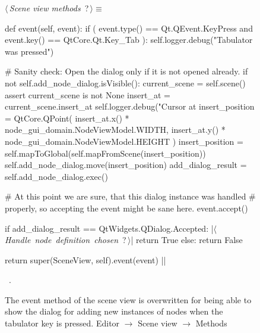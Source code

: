 \documentclass[%
    a4paper,    %
    justified,  %
    nobib,      %
    openany     %
]{tufte-book}
\makeatletter
\renewcommand{\label}[1]{\@tufte@label{##1}}%
\makeatother
\begin{document}
\begin{figure}
\begin{flushleft} \small
\begin{minipage}{\linewidth}\label{scrap151}\raggedright\small
{} $\langle\,${\itshape Scene view methods}\nobreak\ {\footnotesize {?}}$\,\rangle\equiv$
\vspace{-1ex}
\begin{pythoncode}
def event(self, event):
    if (
            event.type() == Qt.QEvent.KeyPress and
            event.key()  == QtCore.Qt.Key_Tab
    ):
        self.logger.debug("Tabulator was pressed")

        # Sanity check: Open the dialog only if it is not opened already.
        if not self.add_node_dialog.isVisible():
            current_scene = self.scene()
            assert current_scene is not None
            insert_at = current_scene.insert_at
            self.logger.debug("Cursor at %
            insert_position = QtCore.QPoint(
                insert_at.x() * node_gui_domain.NodeViewModel.WIDTH,
                insert_at.y() * node_gui_domain.NodeViewModel.HEIGHT
            )
            insert_position = self.mapToGlobal(self.mapFromScene(insert_position))
            self.add_node_dialog.move(insert_position)
            add_dialog_result = self.add_node_dialog.exec()

            # At this point we are sure, that this dialog instance was handled
            # properly, so accepting the event might be sane here.
            event.accept()

            if add_dialog_result == QtWidgets.QDialog.Accepted:
                |\hbox{$\langle\,${\itshape Handle node definition chosen}\nobreak\ {\footnotesize ?}$\,\rangle$}|
                return True
            else:
                return False

    return super(SceneView, self).event(event)
|\NWsep|
\end{pythoncode}
\vspace{1.5ex}
\footnotesize
\begin{list}{}{\setlength{\itemsep}{-\parsep}\setlength{\itemindent}{-\leftmargin}}
\item \NWtxtMacroRefIn\ .

\item{}
\end{list}
\end{minipage}\vspace{4ex}
\end{flushleft}
\caption{The event method of the scene view is overwritten for being able to
  show the dialog for adding new instances of nodes when the tabulator key is
  pressed.
  \newline{}\newline{}Editor $\rightarrow$ Scene view $\rightarrow$ Methods}
\label{editor:lst:scene-view:methods:event}
\end{figure}
\end{document}
